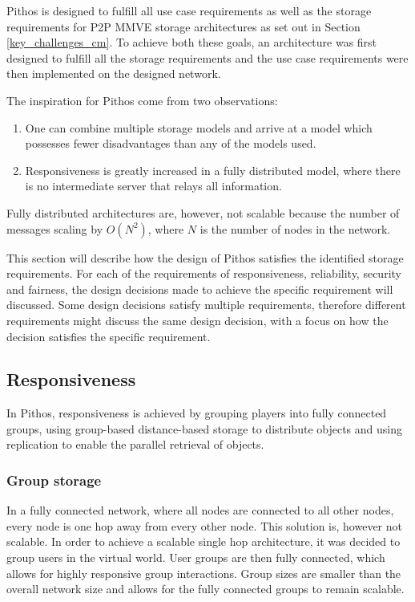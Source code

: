 Pithos is designed to fulfill all use case requirements as well as the storage requirements for P2P MMVE storage architectures as set out in Section \ref{key_challenges_cm}. To achieve both these goals, an architecture was first designed to fulfill all the storage requirements and the use case requirements were then implemented on the designed network.

The inspiration for Pithos come from two observations:
%
\begin{enumerate}
  \item One can combine multiple storage models and arrive at a model which possesses fewer disadvantages than any of the models used.
  \item Responsiveness is greatly increased in a fully distributed model, where there is no intermediate server that relays all information.
\end{enumerate}

Fully distributed architectures are, however, not scalable because the number of messages scaling by $O(N^2)$, where $N$ is the number of nodes in the network.

This section will describe how the design of Pithos satisfies the identified storage requirements. For each of the requirements of responsiveness, reliability, security and fairness, the design decisions made to achieve the specific requirement will discussed. Some design decisions satisfy multiple requirements, therefore different requirements might discuss the same design decision, with a focus on how the decision satisfies the specific requirement.

\subsection{Responsiveness}

In Pithos, responsiveness is achieved by grouping players into fully connected groups, using group-based distance-based storage to distribute objects and using replication to enable the parallel retrieval of objects.

\subsubsection{Group storage}

In a fully connected network, where all nodes are connected to all other nodes, every node is one hop away from every other node. This solution is, however not scalable. In order to achieve a scalable single hop architecture, it was decided to group users in the virtual world. User groups are then fully connected, which allows for highly responsive group interactions. Group sizes are smaller than the overall network size and allows for the fully connected groups to remain scalable.

